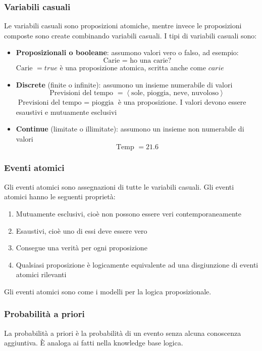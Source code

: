 \documentclass[a4paper]{article}
\begin{document}
\subsubsection{Variabili casuali}
Le variabili casuali sono proposizioni atomiche, mentre invece le proposizioni composte
sono create combinando variabili casuali. I tipi di variabili casuali sono:
\begin{itemize}
  \item \textbf{Proposizionali o booleane}: assumono valori vero o falso, ad esempio:
    \[
     \text{Carie } = \text{ ho una carie?}
    \] 
    \( \text{Carie } = true \) è una proposizione atomica, scritta anche come \( carie \) 
  \item \textbf{Discrete} (finite o infinite): assumono un insieme numerabile di valori
    \[
      \text{Previsioni del tempo } = \left< \text{sole, pioggia, neve, nuvoloso} \right>
    \] 
    \( \text{Previsioni del tempo } = \text{ pioggia} \) è una proposizione. I valori
    devono essere esaustivi e mutuamente esclusivi
  \item \textbf{Continue} (limitate o illimitate): assumono un insieme non numerabile di valori
    \[
      \text{Temp } = 21.6
    \] 
\end{itemize}

\subsubsection{Eventi atomici}
Gli eventi atomici sono assegnazioni di tutte le variabili casuali. Gli eventi atomici
hanno le seguenti proprietà:
\begin{enumerate}
  \item Mutuamente esclusivi, cioè non possono essere veri contemporaneamente
  \item Esaustivi, cioè uno di essi deve essere vero
  \item Consegue una verità per ogni proposizione
  \item Qualsiasi proposizione è logicamente equivalente ad una disgiunzione di eventi atomici
    rilevanti
\end{enumerate}
Gli eventi atomici sono come i modelli per la logica proposizionale.

\subsubsection{Probabilità a priori}
La probabilità a priori è la probabilità di un evento senza alcuna conoscenza
aggiuntiva. È analoga ai fatti nella knowledge base logica.
\end{document}
